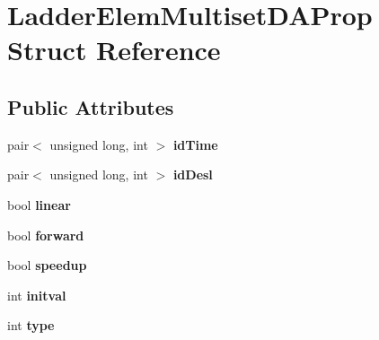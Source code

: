 \hypertarget{struct_ladder_elem_multiset_d_a_prop}{\section{Ladder\-Elem\-Multiset\-D\-A\-Prop Struct Reference}
\label{struct_ladder_elem_multiset_d_a_prop}
}
\subsection*{Public Attributes}
\begin{DoxyCompactItemize}
\item 
\hypertarget{struct_ladder_elem_multiset_d_a_prop_a309962f7e60acc7fbc639d2c2a04e896}{pair$<$ unsigned long, int $>$ {\bfseries id\-Time}}\label{struct_ladder_elem_multiset_d_a_prop_a309962f7e60acc7fbc639d2c2a04e896}

\item 
\hypertarget{struct_ladder_elem_multiset_d_a_prop_aac19747009febc7bfaf3e7c93a82684f}{pair$<$ unsigned long, int $>$ {\bfseries id\-Desl}}\label{struct_ladder_elem_multiset_d_a_prop_aac19747009febc7bfaf3e7c93a82684f}

\item 
\hypertarget{struct_ladder_elem_multiset_d_a_prop_ad9a577c43fe32f7ab042fdc20cdaa335}{bool {\bfseries linear}}\label{struct_ladder_elem_multiset_d_a_prop_ad9a577c43fe32f7ab042fdc20cdaa335}

\item 
\hypertarget{struct_ladder_elem_multiset_d_a_prop_af383a097741cafe9d60b14c52f7e439e}{bool {\bfseries forward}}\label{struct_ladder_elem_multiset_d_a_prop_af383a097741cafe9d60b14c52f7e439e}

\item 
\hypertarget{struct_ladder_elem_multiset_d_a_prop_af60936faab716772807e0195769fd08d}{bool {\bfseries speedup}}\label{struct_ladder_elem_multiset_d_a_prop_af60936faab716772807e0195769fd08d}

\item 
\hypertarget{struct_ladder_elem_multiset_d_a_prop_ae64be18b062ca774f81cb712c56ef475}{int {\bfseries initval}}\label{struct_ladder_elem_multiset_d_a_prop_ae64be18b062ca774f81cb712c56ef475}

\item 
\hypertarget{struct_ladder_elem_multiset_d_a_prop_ab80ea1e9b54d32c5c1376f9c5eec1cf1}{int {\bfseries type}}\label{struct_ladder_elem_multiset_d_a_prop_ab80ea1e9b54d32c5c1376f9c5eec1cf1}


\end{DoxyCompactItemize}
